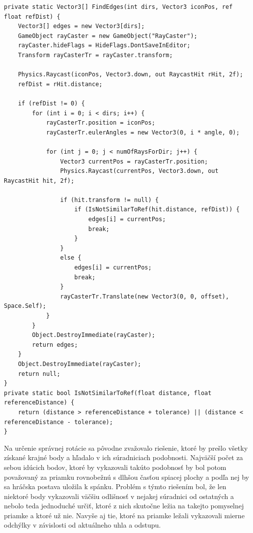 \documentclass[slovak, bachelorpractice]{diploma}
\begin{document}
\vspace{10pt}
\begin{lstlisting}[label=src:findEdges,caption={Získanie referenčnej vzdialenosti a krajných bodov objektu}]
private static Vector3[] FindEdges(int dirs, Vector3 iconPos, ref float refDist) {
    Vector3[] edges = new Vector3[dirs];
    GameObject rayCaster = new GameObject("RayCaster");
    rayCaster.hideFlags = HideFlags.DontSaveInEditor;
    Transform rayCasterTr = rayCaster.transform;

    Physics.Raycast(iconPos, Vector3.down, out RaycastHit rHit, 2f);
    refDist = rHit.distance;

    if (refDist != 0) {
        for (int i = 0; i < dirs; i++) {
            rayCasterTr.position = iconPos;
            rayCasterTr.eulerAngles = new Vector3(0, i * angle, 0);

            for (int j = 0; j < numOfRaysForDir; j++) {
                Vector3 currentPos = rayCasterTr.position;
                Physics.Raycast(currentPos, Vector3.down, out RaycastHit hit, 2f);

                if (hit.transform != null) {
                    if (IsNotSimilarToRef(hit.distance, refDist)) {
                        edges[i] = currentPos;
                        break;
                    }
                }
                else {
                    edges[i] = currentPos;
                    break;
                }
                rayCasterTr.Translate(new Vector3(0, 0, offset), Space.Self);
            }
        }
        Object.DestroyImmediate(rayCaster);
        return edges;
    }
    Object.DestroyImmediate(rayCaster);
    return null;
}
private static bool IsNotSimilarToRef(float distance, float referenceDistance) {
    return (distance > referenceDistance + tolerance) || (distance < referenceDistance - tolerance);
}
\end{lstlisting}

Na určenie správnej rotácie sa pôvodne zvažovalo riešenie, ktoré by prešlo všetky získané krajné body a hľadalo v ich súradniciach podobnosti. Najväčší počet za sebou idúcich bodov, ktoré by vykazovali takúto podobnosť by bol potom považovaný za priamku rovnobežnú s dlhšou časťou spiacej plochy a podľa nej by sa hráčska postava uložila k spánku. Problém s týmto riešením bol, že len niektoré body vykazovali väčšiu odlišnosť v nejakej súradnici od ostatných a nebolo teda jednoduché určiť, ktoré z nich skutočne ležia na takejto pomyselnej priamke a ktoré už nie. Navyše aj tie, ktoré na priamke ležali vykazovali mierne odchýlky v závislosti od aktuálneho uhla a odstupu.
\end{document}
